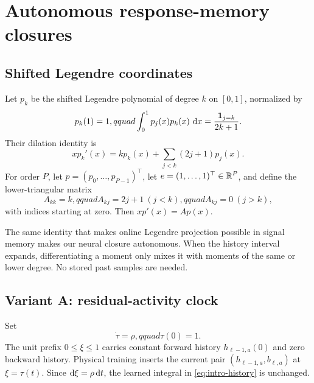 \section{Autonomous response-memory closures}
\label{sec:closure}

\subsection{Shifted Legendre coordinates}

Let $p_k$ be the shifted Legendre polynomial of degree $k$ on $[0,1]$,
normalized by
\begin{equation}
 p_k(1)=1,qquad
 \int_0^1p_j(x)p_k(x)\,\mathop{}\!\mathrm d x=\frac{\mathbf 1_{j=k}}{2k+1}.
 \label{eq:legendre-normalization}
\end{equation}
Their dilation identity is
\begin{equation}
 x p_k'(x)=k p_k(x)+\sum_{j<k}(2j+1)p_j(x).
 \label{eq:legendre-dilation}
\end{equation}
For order $P$, let $p=(p_0,\ldots,p_{P-1})^\top$, let
$e=(1,\ldots,1)^\top\in\mathbb R^P$, and define the lower-triangular matrix
\begin{equation}
 A_{kk}=k,qquad A_{kj}=2j+1\ (j<k),qquad A_{kj}=0\ (j>k),
 \label{eq:A-matrix}
\end{equation}
with indices starting at zero.  Then $xp'(x)=Ap(x)$.

The same identity that makes online Legendre projection possible in signal
memory \citep{gu2020hippo} makes our neural closure autonomous.  When the
history interval expands, differentiating a moment only mixes it with moments
of the same or lower degree.  No stored past samples are needed.

\subsection{Variant A: residual-activity clock}
\label{sec:old-clock}

Set
\begin{equation}
 \dot\tau=\rho,qquad \tau(0)=1.
 \label{eq:activity-clock}
\end{equation}
The unit prefix $0\le\xi\le1$ carries constant forward history
$h_{\ell-1,a}(0)$ and zero backward history.  Physical training inserts the
current pair $(h_{\ell-1,a},b_{\ell,a})$ at
$\xi=\tau(t)$.  Since $\mathop{}\!\mathrm d\xi=\rho\mathop{}\!\mathrm d t$, the learned integral in
\eqref{eq:intro-history} is unchanged.

